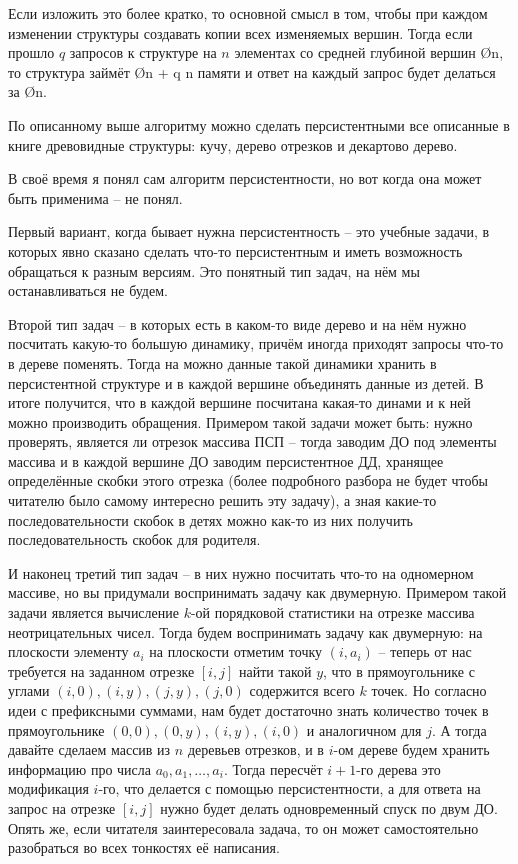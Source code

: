 Если изложить это более кратко, то основной смысл в том, чтобы при каждом изменении структуры создавать копии всех изменяемых вершин. Тогда если прошло $q$ запросов к структуре на $n$ элементах со средней глубиной вершин \O{\log n}, то структура займёт \O{n + q \log n} памяти и ответ на каждый запрос будет делаться за \O{\log n}.

По описанному выше алгоритму можно сделать персистентными все описанные в книге древовидные структуры: кучу, дерево отрезков и декартово дерево.


В своё время я понял сам алгоритм персистентности, но вот когда она может быть применима -- не понял.

Первый вариант, когда бывает нужна персистентность -- это учебные задачи, в которых явно сказано сделать что-то персистентным и иметь возможность обращаться к разным версиям. Это понятный тип задач, на нём мы останавливаться не будем.

Второй тип задач -- в которых есть в каком-то виде дерево и на нём нужно посчитать какую-то большую динамику, причём иногда приходят запросы что-то в дереве поменять. Тогда на можно данные такой динамики хранить в персистентной структуре и в каждой вершине объединять данные из детей. В итоге получится, что в каждой вершине посчитана какая-то динами и к ней можно производить обращения. Примером такой задачи может быть: нужно проверять, является ли отрезок массива ПСП -- тогда заводим ДО под элементы массива и в каждой вершине ДО заводим персистентное ДД, хранящее определённые скобки этого отрезка (более подробного разбора не будет чтобы читателю было самому интересно решить эту задачу), а зная какие-то последовательности скобок в детях можно как-то из них получить последовательность скобок для родителя.

И наконец третий тип задач -- в них нужно посчитать что-то на одномерном массиве, но вы придумали воспринимать задачу как двумерную. Примером такой задачи является вычисление $k$-ой порядковой статистики на отрезке массива неотрицательных чисел. Тогда будем воспринимать задачу как двумерную: на плоскости элементу $a_i$ на плоскости отметим точку $(i, a_i)$ -- теперь от нас требуется на заданном отрезке $[i, j]$ найти такой $y$, что в прямоугольнике с углами $(i, 0), (i, y), (j, y), (j, 0)$ содержится всего $k$ точек. Но согласно идеи с префиксными суммами, нам будет достаточно знать количество точек в прямоугольнике $(0, 0), (0, y), (i, y), (i, 0)$ и аналогичном для $j$. А тогда давайте сделаем массив из $n$ деревьев отрезков, и в $i$-ом дереве будем хранить информацию про числа $a_0, a_1, \ldots, a_i$. Тогда пересчёт $i+1$-го дерева это модификация $i$-го, что делается с помощью персистентности, а для ответа на запрос на отрезке $[i, j]$ нужно будет делать одновременный спуск по двум ДО. Опять же, если читателя заинтересовала задача, то он может самостоятельно разобраться во всех тонкостях её написания.

